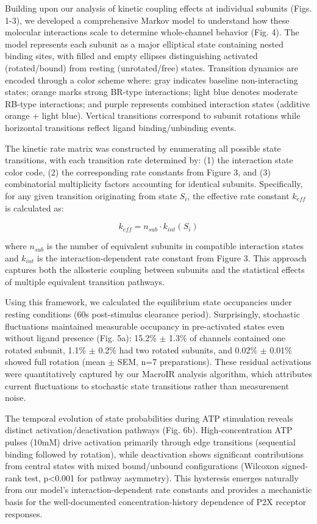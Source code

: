 \documentclass[pdflatex,sn-mathphys-num]{sn-jnl}%
\theoremstyle{thmstyleone}%
\theoremstyle{thmstyletwo}%
\theoremstyle{thmstylethree}%
\begin{document}
Building upon our analysis of kinetic coupling effects at individual subunits (Figs. 1-3), we developed a comprehensive Markov model to understand how these molecular interactions scale to determine whole-channel behavior (Fig. 4). The model represents each subunit as a major elliptical state containing nested binding sites, with filled and empty ellipses distinguishing activated (rotated/bound) from resting (unrotated/free) states. Transition dynamics are encoded through a color scheme where: gray indicates baseline non-interacting states; orange marks strong BR-type interactions; light blue denotes moderate RB-type interactions; and purple represents combined interaction states (additive orange + light blue). Vertical transitions correspond to subunit rotations while horizontal transitions reflect ligand binding/unbinding events.

The kinetic rate matrix was constructed by enumerating all possible state transitions, with each transition rate determined by: (1) the interaction state color code, (2) the corresponding rate constants from Figure 3, and (3) combinatorial multiplicity factors accounting for identical subunits. Specifically, for any given transition originating from state $S_i$, the effective rate constant $k_{eff}$ is calculated as:

\begin{equation}
	k_{eff} = n_{sub} \cdot k_{int}(S_i)
\end{equation}

\noindent where $n_{sub}$ is the number of equivalent subunits in compatible interaction states and $k_{int}$ is the interaction-dependent rate constant from Figure 3. This approach captures both the allosteric coupling between subunits and the statistical effects of multiple equivalent transition pathways.

Using this framework, we calculated the equilibrium state occupancies under resting conditions (60s post-stimulus clearance period). Surprisingly, stochastic fluctuations maintained measurable occupancy in pre-activated states even without ligand presence (Fig. 5a): 15.2\% $\pm$ 1.3\% of channels contained one rotated subunit, 1.1\% $\pm$ 0.2\% had two rotated subunits, and 0.02\% $\pm$ 0.01\% showed full rotation (mean $\pm$ SEM, n=7 preparations). These residual activations were quantitatively captured by our MacroIR analysis algorithm, which attributes current fluctuations to stochastic state transitions rather than measurement noise.

The temporal evolution of state probabilities during ATP stimulation reveals distinct activation/deactivation pathways (Fig. 6b). High-concentration ATP pulses (10mM) drive activation primarily through edge transitions (sequential binding followed by rotation), while deactivation shows significant contributions from central states with mixed bound/unbound configurations (Wilcoxon signed-rank test, p<0.001 for pathway asymmetry). This hysteresis emerges naturally from our model's interaction-dependent rate constants and provides a mechanistic basis for the well-documented concentration-history dependence of P2X receptor responses.
\end{document}
